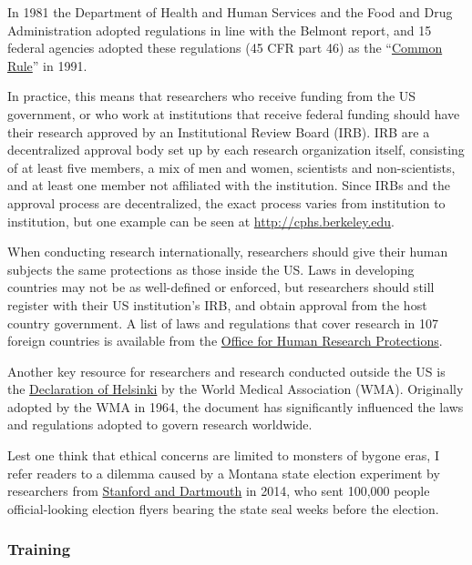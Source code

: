 \documentclass[12pt] {article}
\begin{document}
In 1981 the Department of Health and Human Services and the Food and
Drug Administration adopted regulations in line with the Belmont report,
and 15 federal agencies adopted these regulations (45 CFR part 46) as
the ``\href{http://www.hhs.gov/ohrp/index.html}{Common Rule}'' in 1991. 

In practice, this means that researchers who receive funding from the US
government, or who work at institutions that receive federal funding should have their research approved by an Institutional Review Board (IRB). IRB are a decentralized approval
body set up by each research organization itself, consisting of at least
five members, a mix of men and women, scientists and non-scientists, and
at least one member not affiliated with the institution. Since IRBs and
the approval process are decentralized, the exact process varies from
institution to institution, but one example can be seen at
\url{http://cphs.berkeley.edu}.

When conducting research internationally, researchers should give their
human subjects the same protections as those inside the US. Laws in
developing countries may not be as well-defined or enforced, but
researchers should still register with their US institution's IRB, and
obtain approval from the host country government. A list of laws and
regulations that cover research in 107 foreign countries is available
from the \href{http://www.hhs.gov/ohrp/international/intlcompilation/2014intlcomp.pdf.pdf}
{Office for Human Research Protections}.

Another key resource for researchers and research conducted outside the
US is the \href{http://www.wma.net/en/30publications/10policies/b3/index.html}{Declaration of Helsinki} by the World Medical Association
(WMA). Originally adopted by the WMA in 1964, the document has significantly
influenced the laws and regulations adopted to govern research
worldwide.

Lest one think that ethical concerns are limited to monsters of bygone
eras, I refer readers to a dilemma caused by a Montana state election experiment by
researchers from \href{http://www.washingtonpost.com/blogs/monkey-cage/wp/2014/11/03/ethics-and-research-in-comparative-politics/}{Stanford and Dartmouth} in 2014, who sent 100,000 people official-looking election flyers bearing the state seal weeks before the election.

\subsubsection{Training}\label{training}
\end{document}
